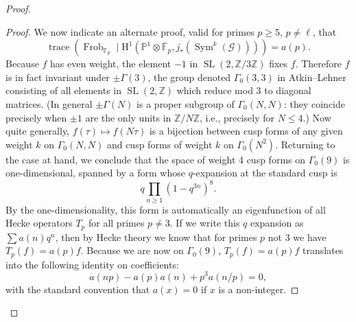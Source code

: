 \begin{proof}
\begin{proof}
We now indicate an alternate proof, valid for primes \(p\geq5\), \(p\ne\ell\), that
\[
\operatorname{trace}(\operatorname{Frob}_{\mathbb{F}_p}\mid\mathrm{H}^1(\mathbb{P}^1\otimes\overline{\mathbb{F}}_p,j_*(\operatorname{Sym}^k(\mathcal{G}))))=a(p).
\]
Because \(f\) has even weight, the element \(-1\) in \(\operatorname{SL}(2,\mathbb{Z}/3\mathbb{Z})\) fixes \(f\). Therefore \(f\) is in fact invariant under \(\pm\Gamma(3)\), the group denoted \(\Gamma_0(3,3)\) in Atkin--Lehner \cite[page 134]{AL} consisting of all elements in \(\operatorname{SL}(2,\mathbb{Z})\) which reduce mod 3 to diagonal matrices. (In general \(\pm\Gamma(N)\) is a proper subgroup of \(\Gamma_0(N,N)\): they coincide precisely when \(\pm1\) are the only units in \(\mathbb{Z}/N\mathbb{Z}\), i.e., precisely for \(N\leq4\).) Now quite generally, \(f(\tau)\mapsto f(N\tau)\) is a bijection between cusp forms of any given weight \(k\) on \(\Gamma_0(N,N)\) and cusp forms of weight \(k\) on \(\Gamma_0(N^2)\). Returning to the case at hand, we conclude that the space of weight 4 cusp forms on \(\Gamma_0(9)\) is one-dimensional, spanned by a form whose \(q\)-expansion at the standard cusp is
\[
q\prod_{n\geq1}(1-q^{3n})^8.
\]
By the one-dimensionality, this form is automatically an eigenfunction of all Hecke operators \(T_p\) for all primes \(p\ne3\). If we write this \(q\) expansion as \(\sum a(n)q^n\), then by Hecke theory we know that for primes \(p\) not 3 we have \(T_p(f)=a(p)f\). Because we are now on \(\Gamma_0(9)\), \(T_p(f)=a(p)f\) translates into the following identity on coefficients:
\[
a(np)-a(p)a(n)+p^3a(n/p)=0,
\]
with the standard convention that \(a(x)=0\) if \(x\) is a non-integer.


\end{proof}
\end{proof}
